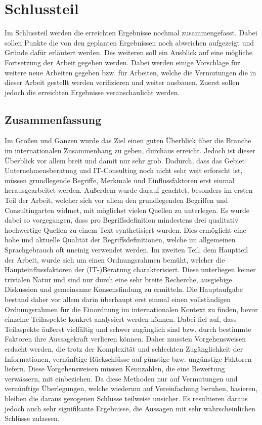 \chapter{Schlussteil}
Im Schlussteil werden die erreichten Ergebnisse nochmal zusammengefasst. Dabei sollen Punkte die von den geplanten Ergebnissen noch abweichen aufgezeigt und Gründe dafür erläutert werden. Des weiteren soll ein Ausblick auf eine mögliche Fortsetzung der Arbeit gegeben werden. Dabei werden einige Vorschläge für weitere neue Arbeiten gegeben bzw. für Arbeiten, welche die Vermutungen die in dieser Arbeit gestellt werden verifizieren und weiter ausbauen. Zuerst sollen jedoch die erreichten Ergebnisse veranschaulicht werden.

\section{Zusammenfassung}
Im Großen und Ganzen wurde das Ziel einen guten Überblick über die Branche im internationalen Zusammenhang zu geben, durchaus erreicht. Jedoch ist dieser Überblick vor allem breit und damit nur sehr grob. Dadurch, dass das Gebiet Unternehmensberatung und IT-Consulting noch nicht sehr weit erforscht ist, müssen grundlegende Begriffe, Merkmale und Einflussfaktoren erst einmal herausgearbeitet werden. 
Außerdem wurde darauf geachtet, besonders im ersten Teil der Arbeit, welcher sich vor allem den grundlegenden Begriffen und Consultingarten widmet, mit möglichst vielen Quellen zu unterlegen. Es wurde dabei so vorgegangen, dass pro Begriffsdefinition mindestens drei qualitativ hochwertige Quellen zu einem Text synthetisiert wurden. Dies ermöglicht eine hohe und aktuelle Qualität der Begriffsdefinitionen, welche im allgemeinen Sprachgebrauch oft uneinig verwendet werden. 
Im zweiten Teil, dem Hauptteil der Arbeit, wurde sich um einen Ordnungsrahmen bemüht, welcher die Haupteinflussfaktoren der (IT-)Beratung charakterisiert. Diese unterliegen keiner trivialen Natur und sind nur durch eine sehr breite Recherche, ausgiebige Diskussion und gemeinsame Konsensfindung zu ermitteln. Die Hauptaufgabe bestand daher vor allem darin überhaupt erst einmal einen vollständigen Ordnungsrahmen für die Einordnung im internationalen Kontext zu finden, bevor einzelne Teilaspekte konkret analysiert werden können.
Dabei fiel auf, dass Teilaspekte äußerst vielfältig und schwer zugänglich sind bzw. durch bestimmte Faktoren ihre Aussagekraft verlieren können. Daher mussten Vorgehensweisen erdacht werden, die trotz der Komplexität und schlechten Zugänglichkeit der Informationen, vernünftige Rückschlüsse auf günstige bzw. ungünstige Faktoren liefern. Diese Vorgehensweisen müssen Kennzahlen, die eine Bewertung verwässern, mit einbeziehen. Da diese Methoden nur auf Vermutungen und vernünftige Überlegungen, welche wiederum auf Vereinfachung beruhen, basieren, bleiben die daraus gezogenen Schlüsse teilweise unsicher. Es resultieren daraus jedoch auch sehr signifikante Ergebnisse, die Aussagen mit sehr wahrscheinlichen Schlüsse zulassen. 
